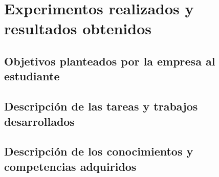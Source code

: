 \section{Experimentos realizados y resultados obtenidos}
\subsection{Objetivos planteados por la empresa al estudiante}


\subsection{Descripción de las tareas y trabajos desarrollados}


\subsection{Descripción de los conocimientos y competencias adquiridos}


\newpage